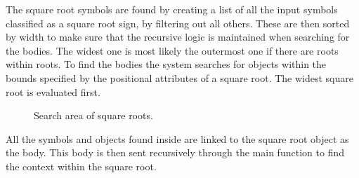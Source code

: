 The square root symbols are found by creating a list of all the input symbols classified as a square root sign, by filtering out all others. These are then sorted by width to make sure that the recursive logic is maintained when searching for the bodies. The widest one is most likely the outermost one if there are roots within roots. To find the bodies the system searches for objects within the bounds specified by the positional attributes of a square root. The widest square root is evaluated first.

\begin{figure}[H]
\centering
    \label{fig:interpretation}
\caption{Search area of square roots.}
\end{figure}

All the symbols and objects found inside are linked to the square root object as the body. This body is then sent recursively through the main function to find the context within the square root.

